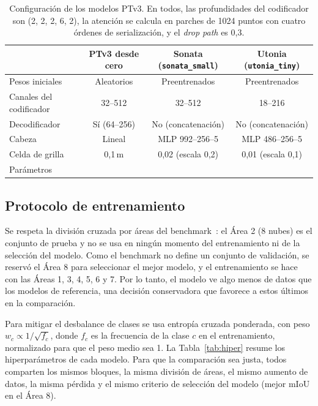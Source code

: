 \documentclass[5p]{elsarticle}
\begin{document}
\begin{table}[t]
\centering
\caption{Configuración de los modelos PTv3. En todos, las profundidades del codificador son (2, 2, 2, 6, 2), la atención se calcula en parches de 1024 puntos con cuatro órdenes de serialización, y el \emph{drop path} es 0,3.}\label{tab:ptv3}
\footnotesize
\setlength{\tabcolsep}{4pt}
\begin{tabular}{@{}lccc@{}}
\toprule
 & PTv3 desde cero & Sonata (\texttt{sonata\_small}) & Utonia (\texttt{utonia\_tiny}) \\
\midrule
Pesos iniciales & Aleatorios & Preentrenados & Preentrenados \\
Canales del codificador & 32--512 & 32--512 & 18--216 \\
Decodificador & Sí (64--256) & No (concatenación) & No (concatenación) \\
Cabeza & Lineal & MLP 992--256--5 & MLP 486--256--5 \\
Celda de grilla & 0,1\,m & 0,02 (escala 0,2) & 0,01 (escala 0,1) \\
Parámetros & %
\bottomrule
\end{tabular}
\end{table}

\subsection{Protocolo de entrenamiento}

Se respeta la división cruzada por áreas del benchmark~\cite{Le2026}: el Área 2 (8 nubes) es el conjunto de prueba y no se usa en ningún momento del entrenamiento ni de la selección del modelo. Como el benchmark no define un conjunto de validación, se reservó el Área 8 para seleccionar el mejor modelo, y el entrenamiento se hace con las Áreas 1, 3, 4, 5, 6 y 7. Por lo tanto, el modelo ve algo menos de datos que los modelos de referencia, una decisión conservadora que favorece a estos últimos en la comparación.

Para mitigar el desbalance de clases se usa entropía cruzada ponderada, con peso $w_c \propto 1/\sqrt{f_c}$, donde $f_c$ es la frecuencia de la clase $c$ en el entrenamiento, normalizado para que el peso medio sea 1. La Tabla~\ref{tab:hiper} resume los hiperparámetros de cada modelo. Para que la comparación sea justa, todos comparten los mismos bloques, la misma división de áreas, el mismo aumento de datos, la misma pérdida y el mismo criterio de selección del modelo (mejor mIoU en el Área 8).
\end{document}
